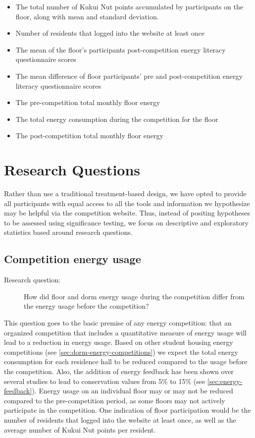 \begin{itemize}
\item The total number of Kukui Nut points accumulated by participants on the floor, along with mean and standard deviation.
\item Number of residents that logged into the website at least once
\item The mean of the floor's participants post-competition energy literacy questionnaire scores
\item The mean difference of floor participants' pre and post-competition energy literacy questionnaire scores
\item The pre-competition total monthly floor energy
\item The total energy consumption during the competition for the floor
\item The post-competition total monthly floor energy
\end{itemize}

\section{Research Questions}

Rather than use a traditional treatment-based design, we have opted to provide all participants with equal access to all the tools and information we hypothesize may be helpful via the competition website. Thus, instead of positing hypotheses to be assessed using significance testing, we focus on descriptive and exploratory statistics based around research questions.

\subsection{Competition energy usage}
\label{sec:competition-energy}

\begin{description}
\item[Research question:] How did floor and dorm energy usage during the competition differ from the energy usage before the competition?
\end{description}

This question goes to the basic premise of any energy competition: that an organized competition that includes a quantitative measure of energy usage will lead to a reduction in energy usage. Based on other student housing energy competitions (see \autoref{sec:dorm-energy-competitions}) we expect the total energy consumption for each residence hall to be reduced compared to the usage before the competition. Also, the addition of energy feedback has been shown over several studies to lead to conservation values from 5\% to 15\% (see \autoref{sec:energy-feedback}). Energy usage on an individual floor may or may not be reduced compared to the pre-competition period, as some floors may not actively participate in the competition. One indication of floor participation would be the number of residents that logged into the website at least once, as well as the average number of Kukui Nut points per resident.

